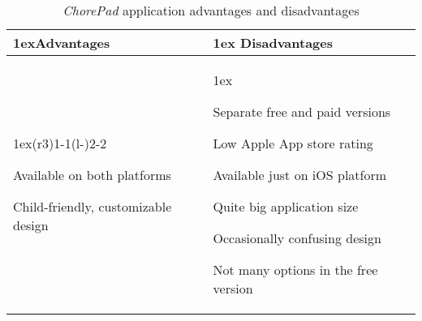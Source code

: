 \begin{table}[htb]
\begin{tabularx}{\linewidth}{>{\parskip1ex}X@{\kern4\tabcolsep}>{\parskip1ex}X}
\toprule
\hfil\bfseries Advantages
&
\hfil\bfseries Disadvantages
\\
\cmidrule(r{3\tabcolsep}){1-1}\cmidrule(l{-\tabcolsep}){2-2}

Available on both platforms\par
Child-friendly, customizable design

&

Separate free and paid versions\par
Low Apple App store rating\par
Available just on iOS platform\par
Quite big application size\par
Occasionally confusing design\par
Not many options in the free version

\\
\bottomrule
\end{tabularx}
\caption{\textit{ChorePad} application advantages and disadvantages}
\label{tab:applications:chorepad}
\end{table}
